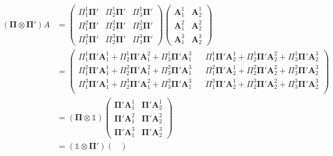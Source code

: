 \documentclass[a4paper,11pt]{article}
\begin{document}
\begin{equation}
  \begin{split}
    ( \mathbf{\Pi} \otimes \mathbf{\Pi}' ) A & =
    \begin{pmatrix}
      \Pi^1_1\mathbf{\Pi}' & \Pi^1_2\mathbf{\Pi}' & \Pi^1_3\mathbf{\Pi}'\\
      \Pi^2_1\mathbf{\Pi}' & \Pi^2_2\mathbf{\Pi}' & \Pi^2_3\mathbf{\Pi}'\\
      \Pi^3_1\mathbf{\Pi}' & \Pi^3_2\mathbf{\Pi}' & \Pi^3_3\mathbf{\Pi}'
    \end{pmatrix}
    \begin{pmatrix}
      \mathbf{A}^1_1 & \mathbf{A}^1_2 \\
      \mathbf{A}^2_1 & \mathbf{A}^2_2 \\
      \mathbf{A}^3_1 & \mathbf{A}^3_2
    \end{pmatrix}\\
    & =
    \begin{pmatrix}
      \Pi^1_1 \mathbf{\Pi}' \mathbf{A}^1_1
      + \Pi^1_2 \mathbf{\Pi}' \mathbf{A}^2_1
      + \Pi^1_3 \mathbf{\Pi}' \mathbf{A}^3_1 &&
      \Pi^1_1 \mathbf{\Pi}' \mathbf{A}^1_2
      + \Pi^1_2 \mathbf{\Pi}' \mathbf{A}^2_2
      + \Pi^1_3 \mathbf{\Pi}' \mathbf{A}^3_2 \\
      \Pi^2_1 \mathbf{\Pi}' \mathbf{A}^1_1
      + \Pi^2_2 \mathbf{\Pi}' \mathbf{A}^2_1
      + \Pi^2_3 \mathbf{\Pi}' \mathbf{A}^3_1 &&
      \Pi^2_1 \mathbf{\Pi}' \mathbf{A}^1_2
      + \Pi^2_2 \mathbf{\Pi}' \mathbf{A}^2_2
      + \Pi^2_3 \mathbf{\Pi}' \mathbf{A}^3_2 \\
      \Pi^3_1 \mathbf{\Pi}' \mathbf{A}^1_1
      + \Pi^3_2 \mathbf{\Pi}' \mathbf{A}^2_1
      + \Pi^3_3 \mathbf{\Pi}' \mathbf{A}^3_1 &&
      \Pi^3_1 \mathbf{\Pi}' \mathbf{A}^1_2
      + \Pi^3_2 \mathbf{\Pi}' \mathbf{A}^2_2
      + \Pi^3_3 \mathbf{\Pi}' \mathbf{A}^3_2 \\
    \end{pmatrix}\\
    & =
    ( \mathbf{\Pi} \otimes \mathbb{1} )
    \begin{pmatrix}
      \mathbf{\Pi}' \mathbf{A}^1_1 & \mathbf{\Pi}' \mathbf{A}^1_2 \\
      \mathbf{\Pi}' \mathbf{A}^2_1 & \mathbf{\Pi}' \mathbf{A}^2_2 \\
      \mathbf{\Pi}' \mathbf{A}^3_1 & \mathbf{\Pi}' \mathbf{A}^3_2
    \end{pmatrix}\\
    & =
    ( \mathbb{1} \otimes \mathbf{\Pi}' )
    \begin{pmatrix}

\end{pmatrix}
\end{split}
\end{equation}
\end{document}
